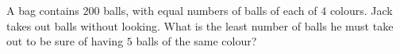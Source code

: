A bag contains $200$ balls, with equal numbers of balls of each of $4$ colours. Jack takes out balls without looking. What is the least number of balls he must take out to be sure of having $5$ balls of the same colour?

